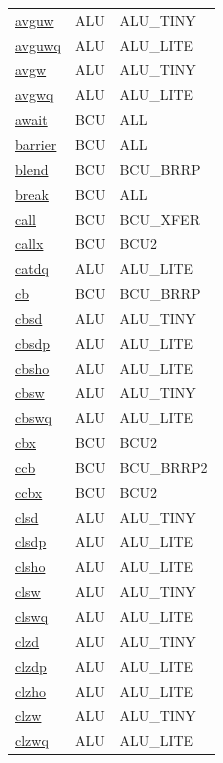 \begin{small}
\begin{longtable}[l]{l l l}
\hyperlink{lvx.avguw}{avguw} & ALU & ALU\_TINY \\ 
\hyperlink{lvx.avguwq}{avguwq} & ALU & ALU\_LITE \\ 
\hyperlink{lvx.avgw}{avgw} & ALU & ALU\_TINY \\ 
\hyperlink{lvx.avgwq}{avgwq} & ALU & ALU\_LITE \\ 
\hyperlink{lvx.await}{await} & BCU & ALL \\ 
\hyperlink{lvx.barrier}{barrier} & BCU & ALL \\ 
\hyperlink{lvx.blend}{blend} & BCU & BCU\_BRRP \\ 
\hyperlink{lvx.break}{break} & BCU & ALL \\ 
\hyperlink{lvx.call}{call} & BCU & BCU\_XFER \\ 
\hyperlink{lvx.callx}{callx} & BCU & BCU2 \\ 
\hyperlink{lvx.catdq}{catdq} & ALU & ALU\_LITE \\ 
\hyperlink{lvx.cb}{cb} & BCU & BCU\_BRRP \\ 
\hyperlink{lvx.cbsd}{cbsd} & ALU & ALU\_TINY \\ 
\hyperlink{lvx.cbsdp}{cbsdp} & ALU & ALU\_LITE \\ 
\hyperlink{lvx.cbsho}{cbsho} & ALU & ALU\_LITE \\ 
\hyperlink{lvx.cbsw}{cbsw} & ALU & ALU\_TINY \\ 
\hyperlink{lvx.cbswq}{cbswq} & ALU & ALU\_LITE \\ 
\hyperlink{lvx.cbx}{cbx} & BCU & BCU2 \\ 
\hyperlink{lvx.ccb}{ccb} & BCU & BCU\_BRRP2 \\ 
\hyperlink{lvx.ccbx}{ccbx} & BCU & BCU2 \\ 
\hyperlink{lvx.clsd}{clsd} & ALU & ALU\_TINY \\ 
\hyperlink{lvx.clsdp}{clsdp} & ALU & ALU\_LITE \\ 
\hyperlink{lvx.clsho}{clsho} & ALU & ALU\_LITE \\ 
\hyperlink{lvx.clsw}{clsw} & ALU & ALU\_TINY \\ 
\hyperlink{lvx.clswq}{clswq} & ALU & ALU\_LITE \\ 
\hyperlink{lvx.clzd}{clzd} & ALU & ALU\_TINY \\ 
\hyperlink{lvx.clzdp}{clzdp} & ALU & ALU\_LITE \\ 
\hyperlink{lvx.clzho}{clzho} & ALU & ALU\_LITE \\ 
\hyperlink{lvx.clzw}{clzw} & ALU & ALU\_TINY \\ 
\hyperlink{lvx.clzwq}{clzwq} & ALU & ALU\_LITE \\ 

\end{longtable}
\end{small}
